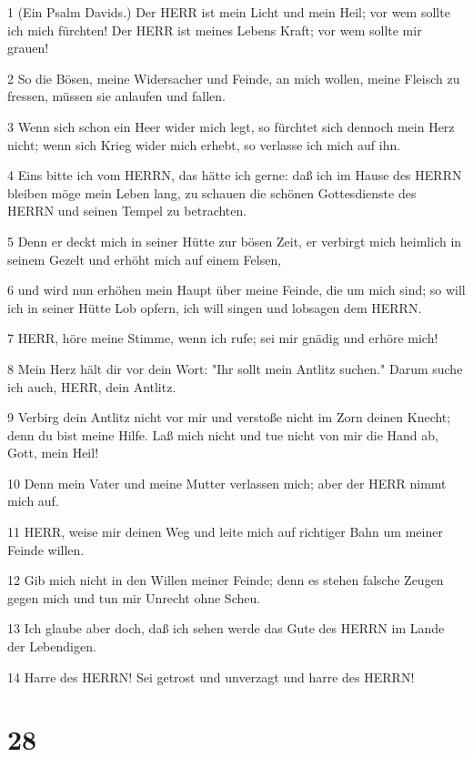 \par 1 (Ein Psalm Davids.) Der HERR ist mein Licht und mein Heil; vor wem sollte ich mich fürchten! Der HERR ist meines Lebens Kraft; vor wem sollte mir grauen!
\par 2 So die Bösen, meine Widersacher und Feinde, an mich wollen, meine Fleisch zu fressen, müssen sie anlaufen und fallen.
\par 3 Wenn sich schon ein Heer wider mich legt, so fürchtet sich dennoch mein Herz nicht; wenn sich Krieg wider mich erhebt, so verlasse ich mich auf ihn.
\par 4 Eins bitte ich vom HERRN, das hätte ich gerne: daß ich im Hause des HERRN bleiben möge mein Leben lang, zu schauen die schönen Gottesdienste des HERRN und seinen Tempel zu betrachten.
\par 5 Denn er deckt mich in seiner Hütte zur bösen Zeit, er verbirgt mich heimlich in seinem Gezelt und erhöht mich auf einem Felsen,
\par 6 und wird nun erhöhen mein Haupt über meine Feinde, die um mich sind; so will ich in seiner Hütte Lob opfern, ich will singen und lobsagen dem HERRN.
\par 7 HERR, höre meine Stimme, wenn ich rufe; sei mir gnädig und erhöre mich!
\par 8 Mein Herz hält dir vor dein Wort: "Ihr sollt mein Antlitz suchen." Darum suche ich auch, HERR, dein Antlitz.
\par 9 Verbirg dein Antlitz nicht vor mir und verstoße nicht im Zorn deinen Knecht; denn du bist meine Hilfe. Laß mich nicht und tue nicht von mir die Hand ab, Gott, mein Heil!
\par 10 Denn mein Vater und meine Mutter verlassen mich; aber der HERR nimmt mich auf.
\par 11 HERR, weise mir deinen Weg und leite mich auf richtiger Bahn um meiner Feinde willen.
\par 12 Gib mich nicht in den Willen meiner Feinde; denn es stehen falsche Zeugen gegen mich und tun mir Unrecht ohne Scheu.
\par 13 Ich glaube aber doch, daß ich sehen werde das Gute des HERRN im Lande der Lebendigen.
\par 14 Harre des HERRN! Sei getrost und unverzagt und harre des HERRN!

\chapter{28}

